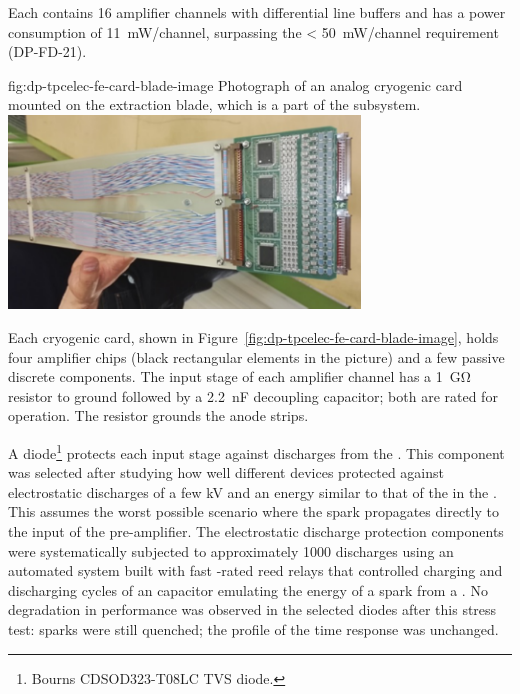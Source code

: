 Each  contains \num{16} amplifier channels with differential line buffers and has a power consumption of \SI{11}{\milli\watt/channel}, surpassing the \SI{< 50}{\milli\watt/channel} requirement (DP-FD-21). 


\begin{dunefigure}{fig:dp-tpcelec-fe-card-blade-image}
{Photograph of an analog cryogenic  card mounted on the extraction blade, which is a part of the  subsystem.}
\includegraphics[width=0.7\textwidth]{graphics/dp-tpcelec-fe-card-blade-image}
\end{dunefigure}

Each cryogenic  card, shown in Figure~\ref{fig:dp-tpcelec-fe-card-blade-image}, holds four  amplifier chips (black rectangular elements in the picture) and a few passive discrete components. The input stage of each amplifier channel has a \SI{1}{\giga\ohm} resistor to ground followed by a \SI{2.2}{\nano\farad} decoupling capacitor; both are rated for  operation. The resistor grounds the  anode strips. 

A  diode\footnote{Bourns\texttrademark{} CDSOD323-T08LC TVS diode.}  protects each input stage against discharges from the . This component was selected after studying how well different devices protected against electrostatic discharges of a few \si{kV} and an energy similar to that of the  in the . This assumes the worst possible scenario where the spark propagates directly to the input of the pre-amplifier. The electrostatic discharge protection components were systematically subjected to approximately \num{1000} discharges using an automated system built with fast -rated reed relays that controlled charging and discharging cycles of an  capacitor emulating the energy of a spark from a . No degradation in performance was observed in the selected  diodes after this stress test: sparks were still quenched; the profile of the time response was unchanged.

